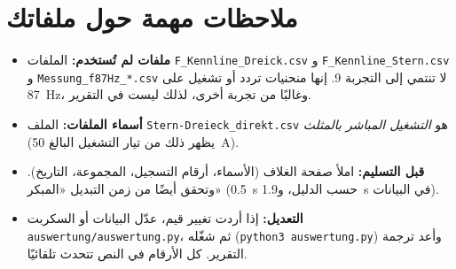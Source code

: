 \documentclass[11pt,a4paper]{article}
\newcommand{\dt}[1]{\textgerman{#1}}
\newcommand{\datei}[1]{\textgerman{\texttt{#1}}}
\begin{document}
\section{ملاحظات مهمة حول ملفاتك}
\begin{itemize}
\item \textbf{ملفات لم تُستخدم:} الملفات \datei{F\_Kennline\_Dreick.csv} و
  \datei{F\_Kennline\_Stern.csv} و \datei{Messung\_f87Hz\_*.csv} لا تنتمي إلى التجربة 9.
  إنها منحنيات تردد أو تشغيل على \SI{87}{Hz}، وغالبًا من تجربة أخرى، لذلك ليست في التقرير.
\item \textbf{أسماء الملفات:} الملف \datei{Stern-Dreieck\_direkt.csv} هو \emph{التشغيل المباشر بالمثلث}
  (يظهر ذلك من تيار التشغيل البالغ \SI{50}{A}).
\item \textbf{قبل التسليم:} املأ صفحة الغلاف (الأسماء، أرقام التسجيل، المجموعة، التاريخ).
  وتحقق أيضًا من زمن التبديل «المبكر» (\SI{0,5}{s} حسب الدليل، و\SI{1,9}{s} في البيانات).
\item \textbf{التعديل:} إذا أردت تغيير قيم، عدّل البيانات أو السكربت \datei{auswertung/auswertung.py}،
  ثم شغّله \dt{(\texttt{python3 auswertung.py})} وأعد ترجمة التقرير. كل الأرقام في النص تتحدث تلقائيًا.
\end{itemize}
\end{document}
